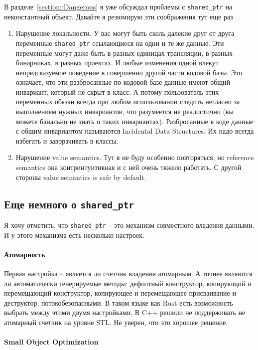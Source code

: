 В разделе~\ref{section::Dangerous} я уже обсуждал проблемы с \texttt{shared\_ptr} на неконстантный объект.
Давайте я резюмирую эти соображения тут еще раз
\begin{enumerate}
\item Нарушение локальности.
У вас могут быть сколь далекие друг от друга переменные \texttt{shared\_ptr} ссылающиеся на одни и те же данные.
Эти переменные могут даже быть в разных единицах трансляции, в разных бинарниках, в разных проектах.
И любые изменения одной влекут непредсказуемое поведение в совершенно другой части кодовой базы.
Это означает, что эти разбросанные по кодовой базе данные имеют общий инвариант, который не скрыт в класс.
А потому пользователь этих переменных обязан всегда при любом использовании следить негласно за выполнением нужных инвариантов, что разумеется не реалистично (вы можете банально не знать о таких инвариантах).
Разбросанные в коде данные с общим инвариантом называются Incidental Data Structures.
Их надо всегда избегать и заворачивать в классы.

\item Нарушение value semantics.
Тут я не буду особенно повторяться, но reference semantics она контринтуитивная и с ней очень тяжело работать.
С другой стороны value semantics is safe by default.
\end{enumerate}

\subsection{Еще немного о \texttt{shared\_ptr}}
\label{section::SharedPtrImplFeatures}

Я хочу отметить, что \verb"shared_ptr" -- это механизм совместного владения данными.
И у этого механизма есть несколько настроек.

\paragraph{Атомарность}

Первая настройка -- является ли счетчик владения атомарным.
А точнее являются ли автоматически генерируемые методы: дефолтный конструктор, копирующий и перемещающий конструктор, копирующее и перемещающее присваивание и деструктор, потокобезопасными.
В таком языке как Rust есть возможность выбрать между этими двумя  настройками.
В C++ решили не поддерживать не атомарный счетчик на уровне STL.
Не уверен, что это хорошее решение.

\paragraph{Small Object Optimization}

